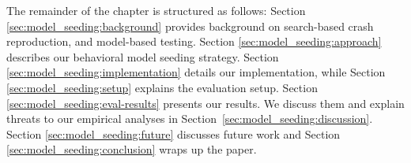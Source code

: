 The remainder of the chapter is structured as follows: Section \ref{sec:model_seeding:background} provides background on search-based crash reproduction, and model-based testing. Section \ref{sec:model_seeding:approach} describes our behavioral model seeding strategy. Section \ref{sec:model_seeding:implementation} details our implementation, while Section \ref{sec:model_seeding:setup} explains the evaluation setup. Section \ref{sec:model_seeding:eval-results} presents our results. We discuss them and explain  threats to our empirical analyses in Section~\ref{sec:model_seeding:discussion}. Section \ref{sec:model_seeding:future} discusses future work and Section \ref{sec:model_seeding:conclusion} wraps up the paper. %